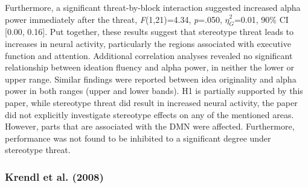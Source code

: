 \documentclass[
  stu]{apa7}
\begin{document}
Furthermore, a significant threat-by-block interaction suggested increased alpha power immediately after the threat, \emph{F}(1,21)=4.34, \emph{p}=.050, \(\hat{\eta}^{2}_{G}\)=0.01, 90\% CI {[}0.00, 0.16{]}.
Put together, these results suggest that stereotype threat leads to increases in neural activity, particularly the regions associated with executive function and attention.
Additional correlation analyses revealed no significant relationship between ideation fluency and alpha power, in neither the lower or upper range.
Similar findings were reported between idea originality and alpha power in both ranges (upper and lower bands).
H1 is partially supported by this paper, while stereotype threat did result in increased neural activity, the paper did not explicitly investigate stereotype effects on any of the mentioned areas. However, parts that are associated with the DMN were affected. Furthermore, performance was not found to be inhibited to a significant degree under stereotype threat.

\subsubsection{Krendl et al. (2008)}\label{krendlnegativeconsequencesthreat2008}
\end{document}
